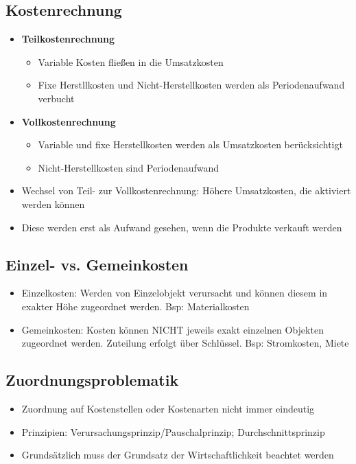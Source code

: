 \subsection{Kostenrechnung}
\begin{itemize}
	\item \textbf{Teilkostenrechnung}
	\begin{itemize}
		\item Variable Kosten fließen in die Umsatzkosten
		\item Fixe Herstllkosten und Nicht-Herstellkosten werden als Periodenaufwand verbucht
	\end{itemize}
	\item \textbf{Vollkostenrechnung}
	\begin{itemize}
		\item Variable und fixe Herstellkosten werden als Umsatzkosten berücksichtigt
		\item Nicht-Herstellkosten sind Periodenaufwand
	\end{itemize}
	\item Wechsel von Teil- zur Vollkostenrechnung: Höhere Umsatzkosten, die aktiviert werden können
	\item Diese werden erst als Aufwand gesehen, wenn die Produkte verkauft werden
\end{itemize}


\subsection{Einzel- vs. Gemeinkosten}
\begin{itemize}
	\item Einzelkosten: Werden von Einzelobjekt verursacht und können diesem in exakter Höhe zugeordnet werden. Bsp: Materialkosten
	\item Gemeinkosten: Kosten können NICHT jeweils exakt einzelnen Objekten zugeordnet werden. Zuteilung erfolgt über Schlüssel. Bsp: Stromkosten, Miete
\end{itemize}


\subsection{Zuordnungsproblematik}
\begin{itemize}
	\item Zuordnung auf Kostenstellen oder Kostenarten nicht immer eindeutig
	\item Prinzipien: Verursachungsprinzip/Pauschalprinzip; Durchschnittsprinzip
	\item Grundsätzlich muss der Grundsatz der Wirtschaftlichkeit beachtet werden
\end{itemize}



